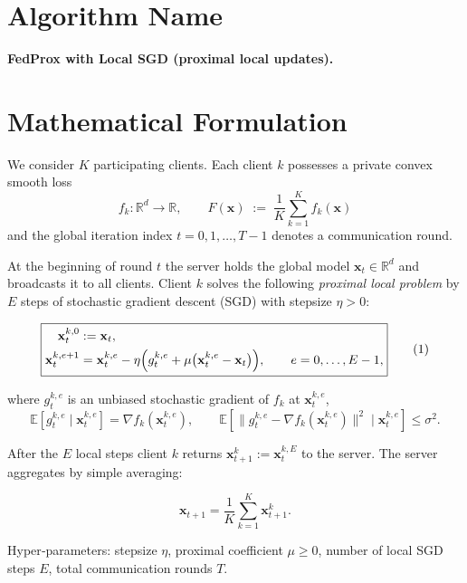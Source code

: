 \documentclass{article}
\newcommand{\E}{\mathbb{E}}
\newcommand{\R}{\mathbb{R}}
\begin{document}
\section*{Algorithm Name}
\textbf{FedProx with Local SGD (proximal local updates).}

\section*{Mathematical Formulation}
We consider $K$ participating clients.  
Each client $k$ possesses a private convex smooth loss 
\[
f_k:\R^d\to\R,\qquad 
F(\mathbf{x})\;:=\;\frac1K\sum_{k=1}^K f_k(\mathbf{x})
\]
and the global iteration index $t=0,1,\dots,T-1$ denotes a communication round.  

At the beginning of round $t$ the server holds the global model $\mathbf{x}_t\in\R^d$ and broadcasts it to all clients.  
Client $k$ solves the following \emph{proximal local problem} by $E$ steps of stochastic gradient descent (SGD) with stepsize $\eta>0$:

\[
\boxed{
\begin{aligned}
\mathbf{x}_{t}^{k,0} &:= \mathbf{x}_t,\\
\mathbf{x}_{t}^{k,e+1} &= \mathbf{x}_{t}^{k,e}
      -\eta\Bigl( g_{t}^{k,e} + \mu\bigl(\mathbf{x}_{t}^{k,e}-\mathbf{x}_t\bigr) \Bigr),
      \qquad e=0,\dots,E-1,
\end{aligned}}
\tag{1}
\]

where $g_{t}^{k,e}$ is an unbiased stochastic gradient of $f_k$ at $\mathbf{x}_{t}^{k,e}$,
\[
\E\!\left[g_{t}^{k,e}\mid\mathbf{x}_{t}^{k,e}\right]=\nabla f_k(\mathbf{x}_{t}^{k,e}),\qquad
\E\!\left[\|g_{t}^{k,e}-\nabla f_k(\mathbf{x}_{t}^{k,e})\|^2\mid\mathbf{x}_{t}^{k,e}\right]\le\sigma^2 .
\]

After the $E$ local steps client $k$ returns $\mathbf{x}_{t+1}^k:=\mathbf{x}_{t}^{k,E}$ to the server.  
The server aggregates by simple averaging:

\[
\boxed{\mathbf{x}_{t+1}= \frac1K\sum_{k=1}^K \mathbf{x}_{t+1}^k.}
\tag{2}
\]

Hyper‑parameters: stepsize $\eta$, proximal coefficient $\mu\ge0$, number of local SGD steps $E$, total communication rounds $T$.
\end{document}
